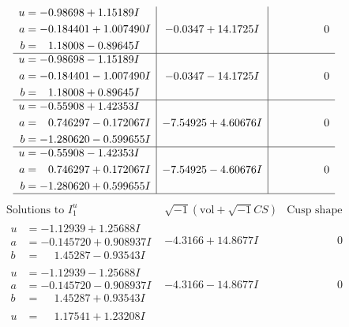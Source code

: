 \documentclass[1p]{elsarticle_modified}
\theoremstyle{definition}
\newcommand{\I}{\sqrt{-1}}
\begin{document}
$$\begin{array}{c|c|c}
\begin{aligned}
u &= -0.98698 + 1.15189 I \\
a &= -0.184401 + 1.007490 I \\
b &= \phantom{-}1.18008 - 0.89645 I\end{aligned}
 & -0.0347 + 14.1725 I & \phantom{-0.000000 } 0 \\ \hline\begin{aligned}
u &= -0.98698 - 1.15189 I \\
a &= -0.184401 - 1.007490 I \\
b &= \phantom{-}1.18008 + 0.89645 I\end{aligned}
 & -0.0347 - 14.1725 I & \phantom{-0.000000 } 0 \\ \hline\begin{aligned}
u &= -0.55908 + 1.42353 I \\
a &= \phantom{-}0.746297 - 0.172067 I \\
b &= -1.280620 - 0.599655 I\end{aligned}
 & -7.54925 + 4.60676 I & \phantom{-0.000000 } 0 \\ \hline\begin{aligned}
u &= -0.55908 - 1.42353 I \\
a &= \phantom{-}0.746297 + 0.172067 I \\
b &= -1.280620 + 0.599655 I\end{aligned}
 & -7.54925 - 4.60676 I & \phantom{-0.000000 } 0\\
 \hline 
 \end{array}$$\newpage$$\begin{array}{c|c|c}  
\text{Solutions to }I^u_{1}& \I (\text{vol} + \sqrt{-1}CS) & \text{Cusp shape}\\
 \hline 
\begin{aligned}
u &= -1.12939 + 1.25688 I \\
a &= -0.145720 + 0.908937 I \\
b &= \phantom{-}1.45287 - 0.93543 I\end{aligned}
 & -4.3166 + 14.8677 I & \phantom{-0.000000 } 0 \\ \hline\begin{aligned}
u &= -1.12939 - 1.25688 I \\
a &= -0.145720 - 0.908937 I \\
b &= \phantom{-}1.45287 + 0.93543 I\end{aligned}
 & -4.3166 - 14.8677 I & \phantom{-0.000000 } 0 \\ \hline\begin{aligned}
u &= \phantom{-}1.17541 + 1.23208 I \\

\end{aligned}
\end{array}$$
\end{document}
